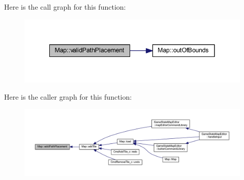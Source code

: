 Here is the call graph for this function\+:\nopagebreak
\begin{figure}[H]
\begin{center}
\leavevmode
\includegraphics[width=341pt]{class_map_a63a6d8a5e6bcbc1cc92cd29fcff638db_cgraph}
\end{center}
\end{figure}




Here is the caller graph for this function\+:
\nopagebreak
\begin{figure}[H]
\begin{center}
\leavevmode
\includegraphics[width=350pt]{class_map_a63a6d8a5e6bcbc1cc92cd29fcff638db_icgraph}
\end{center}
\end{figure}




